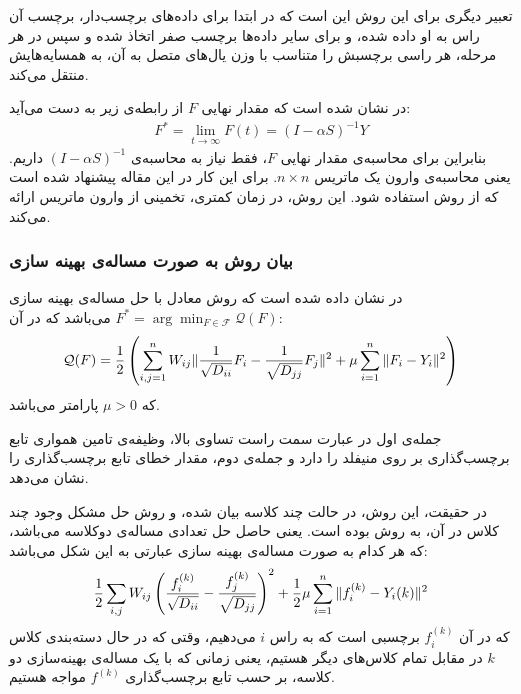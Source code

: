 \documentclass[11pt]{article}
\begin{document}
تعبیر دیگری برای این روش این است که در ابتدا برای داده‌های برچسب‌دار، برچسب آن راس به او داده شده، و برای سایر داده‌ها برچسب صفر اتخاذ شده و سپس در هر مرحله، هر راسی برچسبش را متناسب با وزن یال‌های متصل به آن، به همسایه‌هایش منتقل می‌کند.

در \cite{Zhou_1} نشان شده است که مقدار نهایی $F$ از رابطه‌ی زیر به دست می‌آید:
\begin{eqnarray}
F^* = \lim_{t \rightarrow \infty} F(t) = (I-\alpha S)^{-1}Y
\end{eqnarray}
بنابراین برای محاسبه‌ی مقدار نهایی $F$، فقط نیاز به محاسبه‌ی 
$(I-\alpha S)^{-1}$
داریم. یعنی محاسبه‌ی وارون یک ماتریس $n \times n$. برای این کار در این مقاله پیشنهاد شده است که از روش  استفاده شود. این روش، در زمان کمتری، تخمینی از وارون ماتریس ارائه می‌کند.

\subsubsection*{بیان روش \LGC{} به صورت مساله‌ی بهینه سازی}

در \cite{Zhou_1} نشان داده شده است که روش \LGC{} معادل با حل مساله‌ی بهینه سازی $F^* = \displaystyle \arg\min_{F \in \mathcal{F}} \mathcal{Q}(F)$ می‌باشد که در آن:
\begin{eqnarray} \label{LGC_OPT}
\mathcal{Q}(F) = {1\over2}\left(\displaystyle\sum_{i,j = 1}^nW_{ij}\Vert{1\over \sqrt{D_{ii}}}F_i - {1\over \sqrt{D_{jj}}}F_j\Vert^2+\mu\sum_{i=1}^n\Vert F_i - Y_i \Vert^2\right)
\end{eqnarray}
که $\mu > 0$ پارامتر \regularization{} می‌باشد.

جمله‌ی اول در عبارت سمت راست تساوی بالا، وظیفه‌ی تامین همواری تابع برچسب‌گذاری بر روی منیفلد را دارد و جمله‌ی دوم، مقدار خطای تابع برچسب‌گذاری را نشان می‌دهد.

در حقیقت، این روش، در حالت چند کلاسه بیان شده، و روش حل مشکل وجود چند کلاس در آن، به روش \oAa{} بوده است. یعنی حاصل حل تعدادی مساله‌ی دوکلاسه می‌باشد، که هر کدام به صورت مساله‌ی بهینه سازی عبارتی به این شکل می‌باشد:
\begin{eqnarray}\label{eq:LGC_2class}
{1\over 2}\displaystyle \sum_{i,j}W_{ij}\left({f_i^{(k)} \over \sqrt{D_{ii}}}-{f_j^{(k)} \over \sqrt{D_{jj}}}\right)^2+{1\over 2}\mu\sum_{i=1}^n\Vert f_i^{(k)} - Y_i(k) \Vert^2
\end{eqnarray}
 که در آن $f_i^{(k)}$ برچسبی است که به راس $i$ می‌دهیم، وقتی که در حال دسته‌بندی کلاس $k$ در مقابل تمام کلاس‌های دیگر هستیم، یعنی زمانی که با یک مساله‌ی بهینه‌سازی دو کلاسه، بر حسب تابع برچسب‌گذاری $f^{(k)}$ مواجه هستیم.
\end{document}
